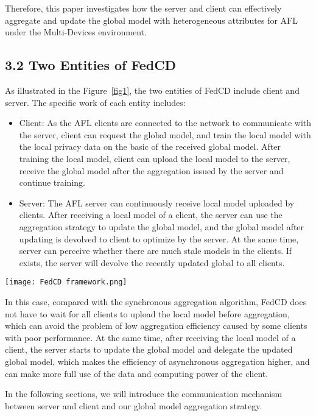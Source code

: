 \documentclass[twoside,twocolumn]{article}
\begin{document}
	Therefore, this paper investigates how the server and client can effectively aggregate and update the global model with heterogeneous attributes for AFL under the Multi-Devices environment.
\subsection{3.2 Two Entities of FedCD}

	As illustrated in the Figure~\ref{fig1}, the two entities of FedCD include client and server. The specific work of each entity includes:
%
\begin{itemize}
	\item Client: As the AFL clients are connected to the network to communicate with the server, client can request the global model, and  train the local model with the local privacy data on the basic of the received global model. After training the local model, client can upload the local model to the server, receive the global model after the aggregation issued by the server and continue training.
%
	\item Server: The AFL server can continuously receive local model uploaded by clients. After receiving a local model of a client, the server can use the aggregation strategy to update the global model, and the global model after updating is devolved to client to optimize by the server. At the same time, server can perceive whether there are much stale models in the clients. If exists, the server will devolve the recently updated global to all clients.
\end{itemize}
%
\begin{figure*}
\centerline{\texttt{[image: FedCD framework.png]}}
\caption{Two entities and their communication mechanism of FedCD.} \label{fig1}
\end{figure*}

	In this case, compared with the synchronous aggregation algorithm, FedCD does not have to wait for all clients to upload the local model before aggregation, which can avoid the problem of low aggregation efficiency caused by some clients with poor performance. At the same time, after receiving the local model of a client, the server starts to update the global model and delegate the updated global model, which makes the efficiency of asynchronous aggregation higher, and can make more full use of the data and computing power of the client.

	In the following sections, we will introduce the communication mechanism between server and client and our global model aggregation strategy.
%
\end{document}
